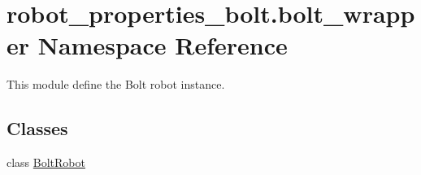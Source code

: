 \hypertarget{namespacerobot__properties__bolt_1_1bolt__wrapper}{}\section{robot\+\_\+properties\+\_\+bolt.\+bolt\+\_\+wrapper Namespace Reference}
\label{namespacerobot__properties__bolt_1_1bolt__wrapper}


This module define the Bolt robot instance.  


\subsection*{Classes}
\begin{DoxyCompactItemize}
\item 
class \hyperlink{classrobot__properties__bolt_1_1bolt__wrapper_1_1BoltRobot}{Bolt\+Robot}
\end{DoxyCompactItemize}
